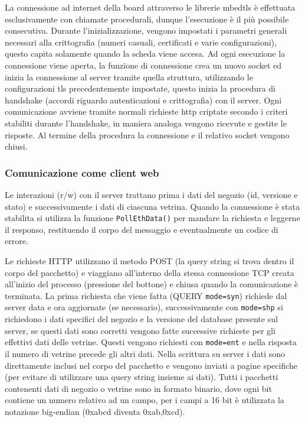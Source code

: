 La connessione ad internet della board attraverso le librerie mbedtls \`e effettuata esclusivamente con chiamate procedurali, dunque l'esecuzione \`e il pi\`u possibile consecutiva. Durante l'inizializzazione, vengono impostati i parametri generali necessari alla crittografia (numeri casuali, certificati e varie configurazioni), questo capita solamente quando la scheda viene accesa. Ad ogni esecuzione la connessione viene aperta, la funzione di connessione crea un nuovo socket ed inizia la connessione al server tramite quella struttura, utilizzando le configurazioni tls precedentemente impostate, questo inizia la procedura di handshake (accordi riguardo autenticazioni e crittografia) con il server. Ogni comunicazione avviene tramite normali richieste http criptate secondo i criteri stabiliti durante l'handshake, in maniera analoga vengono ricevute e gestite le risposte. Al termine della procedura la connessione e il relativo socket vengono chiusi.

\subsubsection{Comunicazione come client web}


Le interazioni (r/w) con il server trattano prima i dati del negozio (id, versione e stato) e successivamente i dati di ciascuna vetrina. Quando la connessione \`e stata stabilita si utilizza la funzione \texttt{PollEthData()} per mandare la richiesta e leggerne il responso, restituendo il corpo del messaggio e eventualmente un codice di errore. 

Le richieste HTTP utilizzano il metodo POST (la query string si trova dentro il corpo del pacchetto) e viaggiano all'interno della stessa connessione TCP creata all'inizio del processo (pressione del bottone) e chiusa quando la comunicazione \`e terminata. La prima richiesta che viene fatta (QUERY \texttt{mode=syn}) richiede dal server data e ora aggiornate (se necessario), successivamente con \texttt{mode=shp} si richiedono i dati specifici del negozio e la versione del database presente sul server, se questi dati sono corretti vengono fatte successive richieste per gli effettivi dati delle vetrine. Questi vengono richiesti con \texttt{mode=ent} e nella risposta il numero di vetrine precede gli altri dati. Nella scrittura su server i dati sono direttamente inclusi nel corpo del pacchetto e vengono inviati a pagine specifiche (per evitare di utilizzare una query string insieme ai dati). Tutti i pacchetti contenenti dati di negozio o vetrine sono in formato binario, dove ogni bit contiene un numero relativo ad un campo, per i campi a 16 bit \`e utilizzata la notazione big-endian (0xabcd diventa 0xab,0xcd). 

